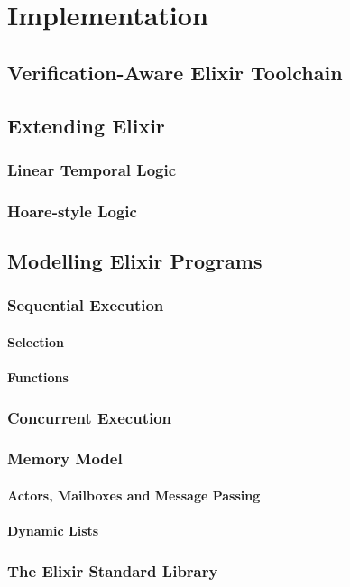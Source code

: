 \chapter{Implementation}
\section{Verification-Aware Elixir Toolchain}
\section{Extending Elixir}
\subsection{Linear Temporal Logic}
\subsection{Hoare-style Logic}
\section{Modelling Elixir Programs}
\subsection{Sequential Execution}
\subsubsection{Selection}
\subsubsection{Functions}
\subsection{Concurrent Execution}
\subsection{Memory Model}
\subsubsection{Actors, Mailboxes and Message Passing}
\subsubsection{Dynamic Lists}
\subsection{The Elixir Standard Library}
